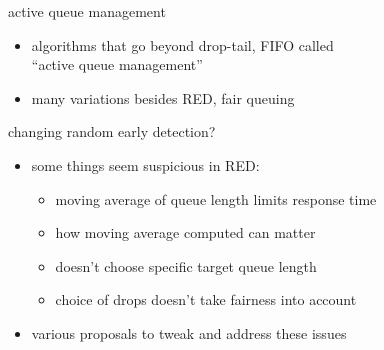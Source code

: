 \begin{frame}{active queue management}
    \begin{itemize}
    \item algorithms that go beyond drop-tail, FIFO called \\
        ``active queue management''
    \vspace{.5cm}
    \item many variations besides RED, fair queuing
    \end{itemize}
\end{frame}

\begin{frame}{changing random early detection?}
    \begin{itemize}
    \item some things seem suspicious in RED:
        \begin{itemize}
        \item moving average of queue length limits response time
        \item how moving average computed can matter
        \item doesn't choose specific target queue length
        \item choice of drops doesn't take fairness into account
        \end{itemize}
    \item various proposals to tweak and address these issues
    \end{itemize}
\end{frame}
